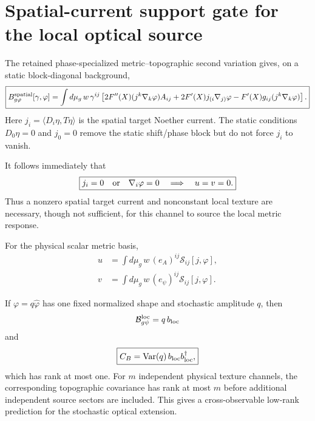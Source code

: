 \section{Spatial-current support gate for the local optical source}
\label{sec:bhsm-optical-current-gate}

The retained phase-specialized metric--topographic second variation gives,
on a static block-diagonal background,
\begin{equation}
\boxed{
B_{g\varphi}^{\rm spatial}[\gamma,\varphi]
=
\int d\mu_g\,w\,\gamma^{ij}
\left[
2F''(X)(j^k\nabla_k\varphi)A_{ij}
+
2F'(X)j_{(i}\nabla_{j)}\varphi
-
F'(X)g_{ij}(j^k\nabla_k\varphi)
\right].
}
\label{eq:spatial-current-mixed}
\end{equation}
Here $j_i=\langle D_i\eta,T\eta\rangle$ is the spatial target Noether current.
The static conditions $D_0\eta=0$ and $j_0=0$ remove the static shift/phase
block but do not force $j_i$ to vanish.

It follows immediately that
\begin{equation}
\boxed{
j_i=0
\quad\hbox{or}\quad
\nabla_i\varphi=0
\quad\Longrightarrow\quad
u=v=0.
}
\end{equation}
Thus a nonzero spatial target current and nonconstant local texture are
necessary, though not sufficient, for this channel to source the local metric
response.

For the physical scalar metric basis,
\begin{align}
u&=\int d\mu_g\,w\,(e_A)^{ij}\mathcal S_{ij}[j,\varphi],\\
v&=\int d\mu_g\,w\,(e_\psi)^{ij}\mathcal S_{ij}[j,\varphi].
\end{align}

If $\varphi=q\widehat\varphi$ has one fixed normalized shape and stochastic
amplitude $q$, then
\begin{equation}
\mathcal B_{g\psi}^{\rm loc}=q\,b_{\rm loc}
\end{equation}
and
\begin{equation}
\boxed{
C_B
=
{\rm Var}(q)\,
b_{\rm loc}b_{\rm loc}^\dagger,
}
\end{equation}
which has rank at most one.  For $m$ independent physical texture channels,
the corresponding topographic covariance has rank at most $m$ before
additional independent source sectors are included.  This gives a
cross-observable low-rank prediction for the stochastic optical extension.
